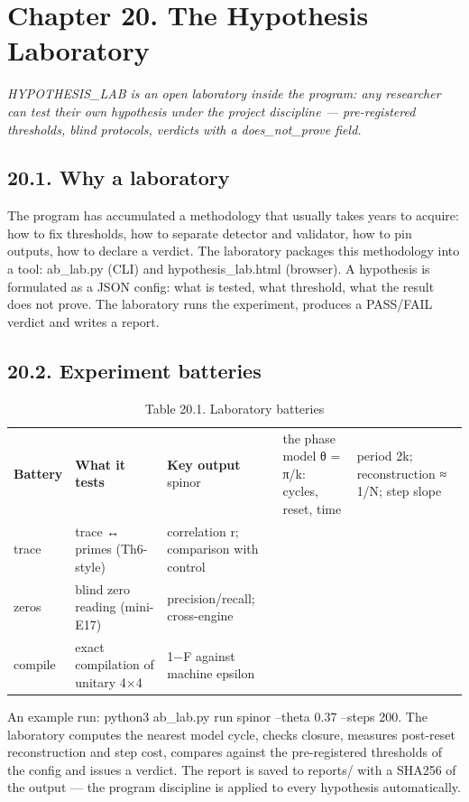 \documentclass[11pt,a4paper]{article}
\begin{document}
\section{Chapter 20. The Hypothesis Laboratory}

\noindent\textit{\color{copper}HYPOTHESIS\_LAB is an open laboratory inside the program: any researcher can test their own hypothesis under the project discipline — pre-registered thresholds, blind protocols, verdicts with a does\_not\_prove field.}

\subsection{20.1. Why a laboratory}

The program has accumulated a methodology that usually takes years to acquire: how to fix thresholds, how to separate detector and validator, how to pin outputs, how to declare a verdict. The laboratory packages this methodology into a tool: ab\_lab.py (CLI) and hypothesis\_lab.html (browser). A hypothesis is formulated as a JSON config: what is tested, what threshold, what the result does not prove. The laboratory runs the experiment, produces a PASS/FAIL verdict and writes a report.

\subsection{20.2. Experiment batteries}

\begin{table}[htbp]\centering\small
\caption{Table 20.1. Laboratory batteries}
\begin{tabular}{p{} p{} p{}}
\toprule
\textbf{Battery} & \textbf{What it tests} & \textbf{Key output}
\midrule
spinor & the phase model θ = π/k: cycles, reset, time & period 2k; reconstruction ≈ 1/N; step slope \\
trace & trace ↔ primes (Th6-style) & correlation r; comparison with control \\
zeros & blind zero reading (mini-E17) & precision/recall; cross-engine \\
compile & exact compilation of unitary 4×4 & 1−F against machine epsilon \\
\bottomrule
\end{tabular}
\end{table}

An example run: python3 ab\_lab.py run spinor --theta 0.37 --steps 200. The laboratory computes the nearest model cycle, checks closure, measures post-reset reconstruction and step cost, compares against the pre-registered thresholds of the config and issues a verdict. The report is saved to reports/ with a SHA256 of the output — the program discipline is applied to every hypothesis automatically.
\end{document}
